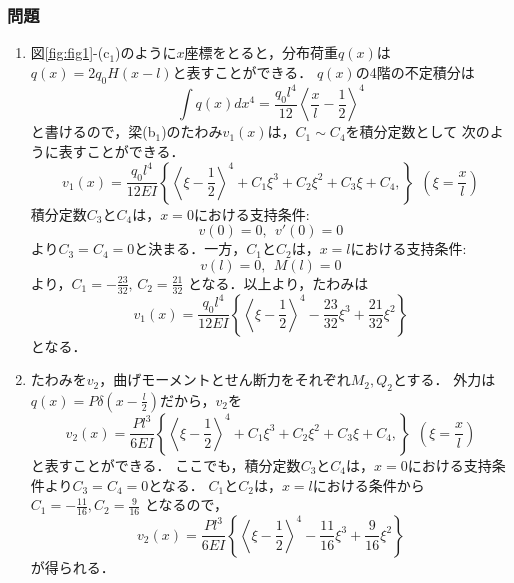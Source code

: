 \documentclass[10pt,a4j]{jarticle}
\begin{document}
\subsubsection*{問題}
\begin{enumerate}
\item
図\ref{fig:fig1}-(c$_1$)のように$x$座標をとると，分布荷重$q(x)$は
$q(x)=2q_0H\left(x-l\right)$と表すことができる．
$q(x)$の4階の不定積分は
\begin{equation}
	\int q(x) dx^4
	= 
	\frac{q_0l^4}{12}
	\left< \frac{x}{l} -\frac{1}{2}\right> ^4
\end{equation}
と書けるので，梁(b$_1$)のたわみ$v_1(x)$は，$C_1\sim C_4$を積分定数として
次のように表すことができる．
	\begin{equation}
	v_1(x)=\frac{q_0l^4}{12EI}\left\{
		\left< \xi -\frac{1}{2} \right> ^4
		+
		C_1 \xi^3 + C_2 \xi^2 + C_3 \xi + C_4,
	\right\}
	\  \	
		\left(\xi=\frac{x}{l}\right)
	\end{equation}
積分定数$C_3$と$C_4$は，$x=0$における支持条件:
\begin{equation}
		v(0)=0,\ \  v'(0)=0
\end{equation}
より$C_3=C_4=0$と決まる．一方，$C_1$と$C_2$は，$x=l$における支持条件:
\begin{equation}
	v(l)=0,\ \  M(l)=0
\end{equation}
より，$C_1=-\frac{23}{32},\, C_2=\frac{21}{32}$
となる．以上より，たわみは
	\begin{equation}
	v_1(x)=\frac{q_0l^4}{12EI}\left\{
		\left< \xi -\frac{1}{2}\right> ^4
		-
		\frac{23}{32}
		\xi^3
		+
		\frac{21}{32}
		\xi^2
	\right\}
	\label{eqn:vx1}
	\end{equation}
となる．
\item
たわみを$v_2$，曲げモーメントとせん断力をそれぞれ$M_2,Q_2$とする．
外力は$q(x)=P\delta(x-\frac{l}{2})$だから，$v_2$を
	\begin{equation}
	v_2(x)=\frac{Pl^3}{6EI}\left\{
		\left< \xi -\frac{1}{2} \right> ^4
		+
		C_1 \xi^3 + C_2 \xi^2 + C_3 \xi + C_4,
	\right\}
	\  \	
		\left(\xi=\frac{x}{l}\right)
	\end{equation}
と表すことができる．
ここでも，積分定数$C_3$と$C_4$は，$x=0$における支持条件より$C_3=C_4=0$となる．
$C_1$と$C_2$は，$x=l$における条件から$C_1=-\frac{11}{16},C_2=\frac{9}{16}$
となるので，
	\begin{equation}
	v_2(x)=\frac{Pl^3}{6EI}\left\{
		\left< \xi -\frac{1}{2} \right> ^4
		-\frac{11}{16}\xi^3 + \frac{9}{16}\xi^2 
	\right\}
		\label{eqn:vx2}
	\end{equation}
が得られる．


\end{enumerate}
\end{document}
